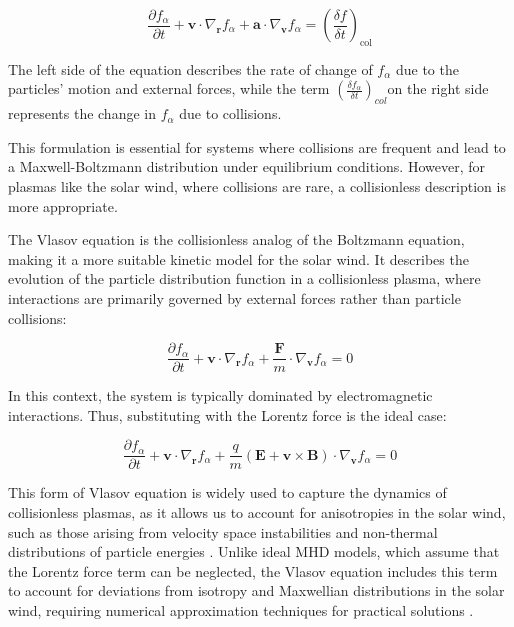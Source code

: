 \documentclass[12pt]{article}
\begin{document}
\begin{equation}
    \frac{\partial f_\alpha}{\partial t} + \mathbf{v} \cdot \nabla_{\mathbf{r}} f_\alpha + \mathbf{a} \cdot \nabla_{\mathbf{v}} f_\alpha = \left(\frac{\delta f}{\delta t}\right)_{\mathrm{col}}
\end{equation}

The left side of the equation describes the rate of change of $f_\alpha$ due to the particles' motion and external forces, while the term $\left( \frac{\delta f_\alpha}{\delta t} \right)_{col}$on the right side represents the change in $f_\alpha$ due to collisions.

This formulation is essential for systems where collisions are frequent and lead to a Maxwell-Boltzmann distribution under equilibrium conditions. However, for plasmas like the solar wind, where collisions are rare, a collisionless description is more appropriate.

The Vlasov equation is the collisionless analog of the Boltzmann equation, making it a more suitable kinetic model for the solar wind. It describes the evolution of the particle distribution function in a collisionless plasma, where interactions are primarily governed by external forces rather than particle collisions:

\begin{equation} \frac{\partial f_\alpha}{\partial t} + \mathbf{v} \cdot \nabla_{\mathbf{r}} f_\alpha + \frac{\mathbf{F}}{m} \cdot \nabla_{\mathbf{v}} f_\alpha = 0 \end{equation}

In this context, the system is typically dominated by electromagnetic interactions. Thus, substituting with the Lorentz force is the ideal case:

\begin{equation}
    \frac{\partial f_\alpha}{\partial t} + \mathbf{v} \cdot \nabla_{\mathbf{r}} f_\alpha + \frac{q}{m} (\mathbf{E} + \mathbf{v} \times \mathbf{B}) \cdot \nabla_{\mathbf{v}} f_\alpha = 0
\end{equation}

This form of Vlasov equation is widely used to capture the dynamics of collisionless plasmas, as it allows us to account for anisotropies in the solar wind, such as those arising from velocity space instabilities and non-thermal distributions of particle energies \cite{Verscharen_2016}. Unlike ideal MHD models, which assume that the Lorentz force term can be neglected, the Vlasov equation includes this term to account for deviations from isotropy and Maxwellian distributions in the solar wind, requiring numerical approximation techniques for practical solutions \cite{grandin2023hybridvlasovsimulationsoftxray}.
\end{document}

